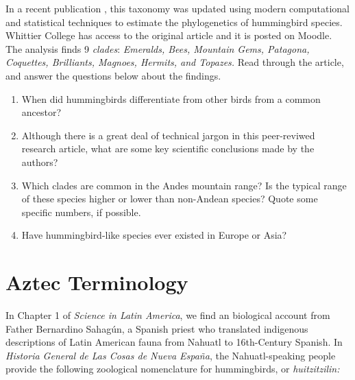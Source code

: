 \documentclass[12pt]{article}
\begin{document}
In a recent publication \cite{10.1016/j.cub.2014.03.016}, this taxonomy was updated using modern computational and statistical techniques to estimate the phylogenetics of hummingbird species.  Whittier College has access to the original article and it is posted on Moodle.  The analysis finds 9 \textit{clades}: \textit{Emeralds, Bees, Mountain Gems, Patagona, Coquettes, Brilliants, Magnoes, Hermits, and Topazes.}  Read through the article, and answer the questions below about the findings.

\begin{enumerate}
\item When did hummingbirds differentiate from other birds from a common ancestor? \\ \vspace{1cm}
\item Although there is a great deal of technical jargon in this peer-reviwed research article, what are some key scientific conclusions made by the authors? \\ \vspace{2cm}
\item Which clades are common in the Andes mountain range?  Is the typical range of these species higher or lower than non-Andean species? Quote some specific numbers, if possible.  \\ \vspace{1cm}
\item Have hummingbird-like species ever existed in Europe or Asia? \\ \vspace{1cm}
\end{enumerate}

\section{Aztec Terminology}

In Chapter 1 of \textit{Science in Latin America}, we find an biological account from Father Bernardino Sahag\'{u}n, a Spanish priest who translated indigenous descriptions of Latin American fauna from Nahuatl to 16th-Century Spanish.  In \textit{Historia General de Las Cosas de Nueva Espa\~{n}a}, the Nahuatl-speaking people provide the following zoological nomenclature for hummingbirds, or \textit{huitzitzilin:}
\end{document}

